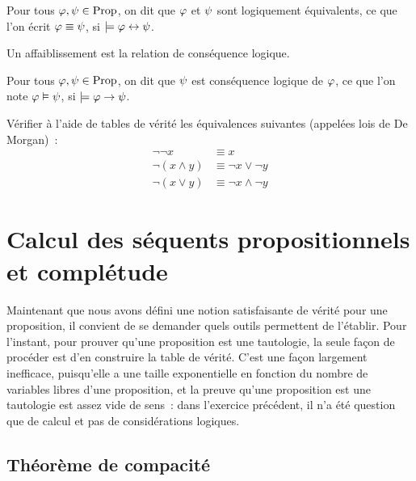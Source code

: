 \begin{definition}
  Pour tous $\varphi,\psi\in\operatorname{Prop}$, on dit que $\varphi$ et $\psi$ sont
  logiquement équivalents,
  ce que l'on écrit $\varphi\equiv \psi$, si
  $\models \varphi \mathrel{\leftrightarrow} \psi$.
\end{definition}

\noindent
Un affaiblissement est la relation de conséquence logique.

\begin{definition}
  Pour tous $\varphi,\psi\in\operatorname{Prop}$, on dit que $\psi$ est conséquence
  logique de $\varphi$, ce que
  l'on note $\varphi\vDash \psi$, si $\models \varphi\to \psi$.
\end{definition}

\begin{exercise}
  Vérifier à l'aide de tables de vérité les équivalences suivantes (appelées
  lois de De Morgan)~:
  \begin{align*}
    \lnot\lnot x &\equiv x\\
    \lnot (x \land y) &\equiv \lnot x \lor \lnot y\\
    \lnot (x \lor y) &\equiv \lnot x \land \lnot y
  \end{align*}
\end{exercise}

\section[Séquents propositionnels]{Calcul des séquents propositionnels et
  complétude}

Maintenant que nous avons défini une notion satisfaisante de vérité pour une
proposition, il convient de se demander quels outils permettent de l'établir.
Pour l'instant, pour prouver qu'une proposition est une tautologie, la seule
façon de procéder est d'en construire la table de vérité. C'est une façon
largement inefficace, puisqu'elle a une taille exponentielle en fonction du
nombre de variables libres d'une proposition, et la preuve qu'une proposition
est une tautologie est assez vide de sens~: dans l'exercice précédent, il n'a
été question que de calcul et pas de considérations logiques.

\subsection{Théorème de compacité}

